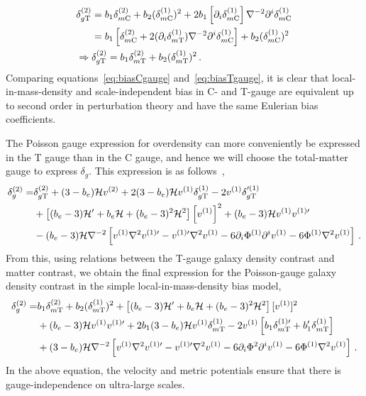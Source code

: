 \begin{align}
	&\delta_{g\mathrm{T}}^\tw = b_1 \delta_{m\cs}^\tw + b_2 (\delta_{m\cs}^\on)^2 + 2 b_1 \left[\partial_i \delta_{m\cs}^\on \right] \nabla^{-2} \partial^i \delta_{m\cs}^\on \\
	& \hphantom{\delta_{g\mathrm{T}}^\tw } = b_1 \left[ \delta_{m\cs}^\tw + 2 (\partial_i \delta_{m\mathrm{T}}^\on) \nabla^{-2} \partial^i \delta_{m\cs}^\on \right] + b_2 (\delta_{m\cs}^\on)^2 \\
	& \Rightarrow \delta_{g\mathrm{T}}^\tw = b_1 \delta_{m\mathrm{T}}^\tw + b_2 (\delta_{m\mathrm{T}}^\on)^2 \label{eq:biasTgauge} \,.
\end{align}
Comparing equations~\eqref{eq:biasCgauge} and~\eqref{eq:biasTgauge}, it is clear that local-in-mass-density and scale-independent bias in C- and T-gauge are equivalent up to second order in perturbation theory and have the same Eulerian bias coefficients. 

The Poisson gauge expression for overdensity can more conveniently be expressed in the T gauge than in the C gauge, and hence we will choose the total-matter gauge to express $\delta_g$. This expression is as follows~\cite{Jolicoeur:2017nyt},
\begin{align}
	\delta_g^{(2)} =& \delta_{g\mathrm{T}}^{(2)} + (3 - b_e)\mathcal{H} v^{(2)} + 2 (3 - b_e) \mathcal{H} v^{(1)} \delta_{g\mathrm{T}}^{(1)} - 2 v^{(1)} \delta_{g\mathrm{T}}'^{(1)} \nonumber \\
	&+ \left[ (b_e - 3)\mathcal{H}' + b_e \mathcal{H} + (b_e -3)^2 \mathcal{H}^2  \right] \left[ v^{(1)} \right]^2 + (b_e - 3) \mathcal{H} v^{(1)} v^{{(1)}\prime} \nonumber \\
	& - (b_e - 3) \mathcal{H} \nabla^{-2} \left[ v^{(1)} \nabla^2 v^{{(1)}\prime} - v^{{(1)}\prime} \nabla^2 v^{(1)} - 6 \partial_i \Phi^{(1)} \partial^i v^{(1)} - 6 \Phi^{(1)} \nabla^2 v^{(1)} \right] \,.
\end{align}
From this, using relations between the T-gauge galaxy density contrast and matter contrast, we obtain the final expression for the Poisson-gauge galaxy density contrast in the simple local-in-mass-density bias model, 
\begin{align}
	\delta_g^{(2)} =& b_1 \delta_{m\mathrm{T}}^{(2)} + b_2 (\delta_{m\mathrm{T}}^{(1)} )^2 + \left[ (b_e - 3)\mathcal{H}' + b_e \mathcal{H} + (b_e -3)^2 \mathcal{H}^2 \right] [v^{(1)}]^2 \nonumber \\
	&+ (b_e - 3) \mathcal{H} v^{(1)} v^{{(1)} \prime} + 2 b_1 (3 - b_e) \mathcal{H} v^{(1)} \delta_{m\mathrm{T}}^{(1)} - 2 v^{(1)} \left[ b_1 \delta_{m\mathrm{T}}^{{(1)} \prime} + b_1' \delta_{m\mathrm{T}}^{(1)} \right] \nonumber \\
	& + (3 - b_e) \mathcal{H} \nabla^{-2} \left[ v^{(1)} \nabla^2 v^{{(1)} \prime} - v^{{(1)} \prime} \nabla^2 v^{(1)} - 6 \partial_i \Phi^2 \partial^i v^{(1)} - 6 \Phi^{(1)} \nabla^2 v^{(1)} \right]\,.
\end{align}
In the above equation, the velocity and metric potentials ensure that there is gauge-independence on ultra-large scales. 


